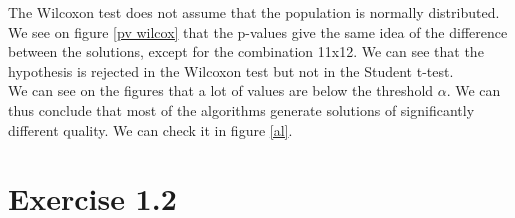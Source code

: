 The Wilcoxon test does not assume that the population is normally distributed. We see on figure \ref{pv wilcox} that the p-values give the same idea of the difference between the solutions, except for the combination 11x12. We can see that the hypothesis is rejected in the Wilcoxon test but not in the Student t-test.\\

We can see on the figures that a lot of values are below the threshold $\alpha$. We can thus conclude that most of the algorithms generate solutions of significantly different quality. We can check it in figure \ref{al}.


\section{Exercise 1.2}


